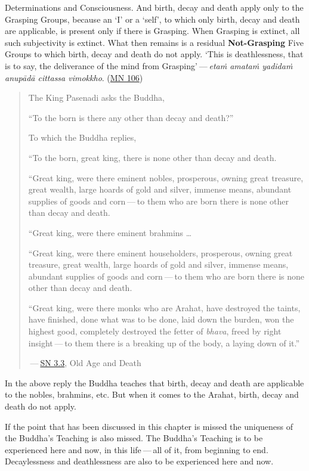 Determinations and Consciousness. And birth, decay and death apply only to the Grasping Groups, because an `I' or a `self', to which only birth, decay and death are applicable, is present only if there is Grasping. When Grasping is extinct, all such subjectivity is extinct. What then remains is a residual \textbf{Not-Grasping} Five Groups to which birth, decay and death do not apply. `This is deathlessness, that is to say, the deliverance of the mind from Grasping' --- \emph{etaṁ amataṁ yadidaṁ anupādā cittassa vimokkho}. (\href{https://suttacentral.net/mn106/en/sujato}{MN 106})

\begin{quote}
The King Pasenadi asks the Buddha,

``To the born is there any other than decay and death?''

To which the Buddha replies,

``To the born, great king, there is none other than decay and death.

``Great king, were there eminent nobles, prosperous, owning great treasure, great wealth, large hoards of gold and silver, immense means, abundant supplies of goods and corn --- to them who are born there is none other than decay and death.

``Great king, were there eminent brahmins \ldots\hspace{0pt}

``Great king, were there eminent householders, prosperous, owning great treasure, great wealth, large hoards of gold and silver, immense means, abundant supplies of goods and corn --- to them who are born there is none other than decay and death.

``Great king, were there monks who are Arahat, have destroyed the taints, have finished, done what was to be done, laid down the burden, won the highest good, completely destroyed the fetter of \emph{bhava}, freed by right insight --- to them there is a breaking up of the body, a laying down of it.''

 --- \href{https://suttacentral.net/sn3.3/en/sujato}{SN 3.3}, Old Age and Death
\end{quote}

In the above reply the Buddha teaches that birth, decay and death are applicable to the nobles, brahmins, etc. But when it comes to the Arahat, birth, decay and death do not apply.

If the point that has been discussed in this chapter is missed the uniqueness of the Buddha's Teaching is also missed. The Buddha's Teaching is to be experienced here and now, in this life --- all of it, from beginning to end. Decaylessness and deathlessness are also to be experienced here and now.
